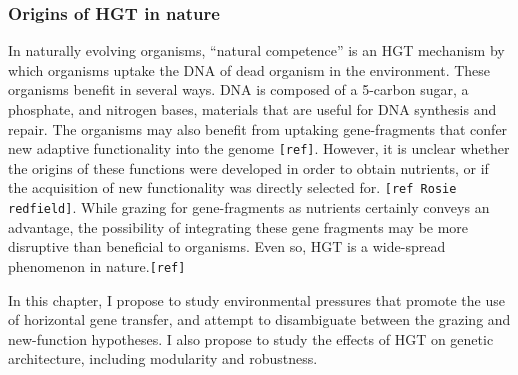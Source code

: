 \subsubsection{Origins of HGT in nature}

In naturally evolving organisms, “natural competence” is an HGT mechanism by which organisms uptake the DNA of dead organism in the environment. These organisms benefit in several ways. DNA is composed of a 5-carbon sugar, a phosphate, and nitrogen bases, materials that are useful for DNA synthesis and repair. The organisms may also benefit from uptaking gene-fragments that confer new adaptive functionality into the genome \verb|[ref]|. However, it is unclear whether the origins of these functions were developed in order to obtain nutrients, or if the acquisition of new functionality was directly selected for. \verb|[ref Rosie redfield]|. While grazing for gene-fragments as nutrients certainly conveys an advantage, the possibility of integrating these gene fragments may be more disruptive than beneficial to organisms. Even so, HGT is a wide-spread phenomenon in nature.\verb|[ref]|

In this chapter, I propose to study environmental pressures that promote the use of horizontal gene transfer, and attempt to disambiguate between the grazing and new-function hypotheses. I also propose to study the effects of HGT on genetic architecture, including modularity and robustness.